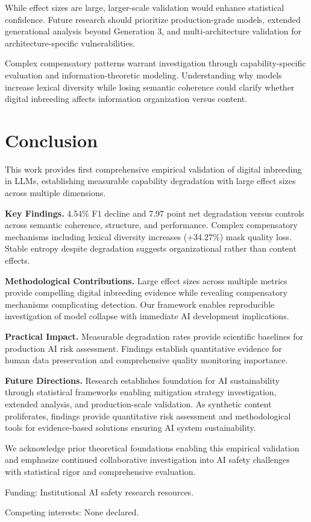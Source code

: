 \documentclass{article}
\begin{document}
While effect sizes are large, larger-scale validation would enhance statistical confidence. Future research should prioritize production-grade models, extended generational analysis beyond Generation 3, and multi-architecture validation for architecture-specific vulnerabilities.

Complex compensatory patterns warrant investigation through capability-specific evaluation and information-theoretic modeling. Understanding why models increase lexical diversity while losing semantic coherence could clarify whether digital inbreeding affects information organization versus content.

\section{Conclusion}

This work provides first comprehensive empirical validation of digital inbreeding in LLMs, establishing measurable capability degradation with large effect sizes across multiple dimensions.

\textbf{Key Findings.} 4.54\% F1 decline and 7.97 point net degradation versus controls across semantic coherence, structure, and performance. Complex compensatory mechanisms including lexical diversity increases (+34.27\%) mask quality loss. Stable entropy despite degradation suggests organizational rather than content effects.

\textbf{Methodological Contributions.} Large effect sizes across multiple metrics provide compelling digital inbreeding evidence while revealing compensatory mechanisms complicating detection. Our framework enables reproducible investigation of model collapse with immediate AI development implications.

\textbf{Practical Impact.} Measurable degradation rates provide scientific baselines for production AI risk assessment. Findings establish quantitative evidence for human data preservation and comprehensive quality monitoring importance.

\textbf{Future Directions.} Research establishes foundation for AI sustainability through statistical frameworks enabling mitigation strategy investigation, extended analysis, and production-scale validation. As synthetic content proliferates, findings provide quantitative risk assessment and methodological tools for evidence-based solutions ensuring AI system sustainability.

\begin{ack}
We acknowledge prior theoretical foundations enabling this empirical validation and emphasize continued collaborative investigation into AI safety challenges with statistical rigor and comprehensive evaluation.

Funding: Institutional AI safety research resources.

Competing interests: None declared.
\end{ack}
\end{document}
